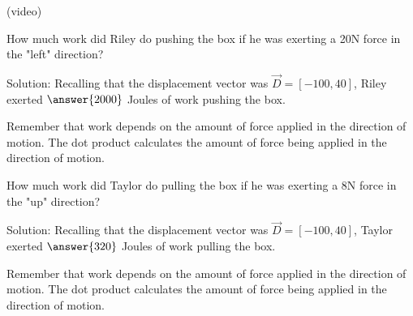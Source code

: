 \documentclass{ximera}
\begin{document}
(video)

\begin{problem}
    How much work did Riley do pushing the box if he was exerting a 20N force in the "left" direction?

    Solution: Recalling that the displacement vector was $\vec{D}=[-100,40]$, Riley exerted $\answer{2000}$ Joules of work pushing the box.

    \begin{feedback}
        Remember that work depends on the amount of force applied in the direction of motion. The dot product calculates the amount of force being applied in the direction of motion.
    \end{feedback}
\end{problem}

\begin{problem}
    How much work did Taylor do pulling the box if he was exerting a 8N force in the "up" direction?

    Solution: Recalling that the displacement vector was $\vec{D}=[-100,40]$, Taylor exerted $\answer{320}$ Joules of work pulling the box.

        \begin{feedback}
        Remember that work depends on the amount of force applied in the direction of motion. The dot product calculates the amount of force being applied in the direction of motion.
    \end{feedback}
\end{problem}
\end{document}
